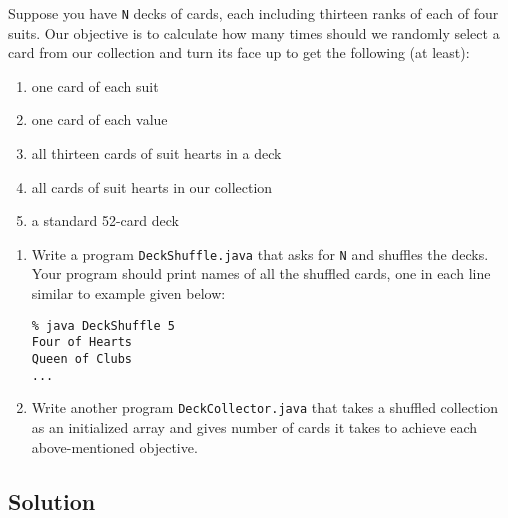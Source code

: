 \documentclass[12pt,letterpaper,twoside]{article}
\begin{document}
Suppose you have \texttt{N} decks of cards, each including thirteen ranks of each of four suits. Our objective is to calculate how many times should we randomly select a card from our collection and turn its face up to get the following (at least):
\begin{enumerate}[itemsep=0mm,label=(\alph*)]
\item one card of each suit
\item one card of each value
\item all thirteen cards of suit hearts in a deck
\item all cards of suit hearts in our collection
\item a standard 52-card deck
\end{enumerate}

\begin{enumerate}
\item Write a program \texttt{DeckShuffle.java} that asks for \texttt{N} and shuffles the decks. Your program should print names of all the shuffled cards, one in each line similar to example given below:
\begin{verbatim}
% java DeckShuffle 5
Four of Hearts
Queen of Clubs
...
\end{verbatim}
\item Write another program \texttt{DeckCollector.java} that takes a shuffled collection as an initialized array and gives number of cards it takes to achieve each above-mentioned objective.
\end{enumerate}

\subsection*{Solution}
\end{document}

